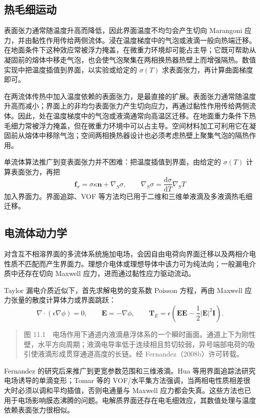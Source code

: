\documentclass[11pt,a4paper,openany,fontset=none]{ctexbook}
\begin{document}
\subsection{热毛细运动}
表面张力通常随温度升高而降低，因此界面温度不均匀会产生切向 Marangoni 应力，并由黏性作用传给两侧流体。浸在温度梯度中的气泡或液滴一般向热端迁移。在地面条件下这种效应常被浮力掩盖，在微重力环境却可能占主导；它既可帮助从凝固前的熔体中移走气泡，也会使气泡聚集在两相换热器热壁上而增强隔热。数值实现中把温度插值到界面，以实验或给定的 $\sigma(T)$ 求表面张力，再计算曲面梯度即可。


在两流体传热中加入温度依赖的表面张力，是最直接的扩展。表面张力通常随温度升高而减小；界面上的非均匀表面张力产生切向应力，再通过黏性作用传给两侧流体。因此，处在温度梯度中的气泡或液滴通常向高温区迁移。在地面重力条件下热毛细力常被浮力掩盖，但在微重力环境中可以占主导。空间材料加工可利用它在凝固前从熔体中移除气泡；空间两相换热器设计也必须考虑热壁上聚集气泡的隔热作用。

单流体算法推广到变表面张力并不困难：把温度插值到界面，由给定的 $\sigma(T)$ 计算表面张力，再把
\begin{equation*}
 \bm f_\sigma=\sigma\kappa\bm n+\nabla_S\sigma,
 \qquad \nabla_S\sigma=\frac{\mathrm d\sigma}{\mathrm dT}\nabla_ST
\end{equation*}
加入界面力。界面追踪、VOF 等方法均已用于二维和三维单液滴及多液滴热毛细迁移。

\subsection{电流体动力学}

对含互不相溶界面的多流体系统施加电场，会因自由电荷向界面迁移以及两相介电性质不匹配而产生界面力。理想介电体或理想导体中该力可为纯法向；一般漏电介质中还存在切向 Maxwell 应力，进而通过黏性应力驱动流动。

Taylor 漏电介质近似下，首先求解电势的变系数 Poisson 方程，再由 Maxwell 应力张量的散度计算体力或界面跳跃：
\begin{equation*}
 \nabla\cdot(\epsilon\nabla\phi)=0,
 \qquad \bm E=-\nabla\phi,
 \qquad \bm T_E=\epsilon\left(\bm E\bm E-\frac12|\bm E|^2\bm I\right).
\end{equation*}
\begin{quote}\small 图 11.1　电场作用下通道内液滴悬浮体系的一个瞬时画面。通道上下为刚性壁，水平方向周期；液滴电导率低于连续相且剪切较弱，异号端部电荷的吸引使液滴形成贯穿通道高度的长链。经 Fernandez（2008b）许可转载。\end{quote}
Fernandez 的研究后来推广到更宽参数范围和三维液滴。Hua 等用界面追踪法研究电场诱导的单滴变形；Tomar 等的 VOF/水平集方法强调，当两相电性质相差很大时必须以调和平均插值，否则电通量与 Maxwell 应力都会失真。这些方法也已用于电场影响膜态沸腾的问题。电解质界面还存在电毛细效应，其数值处理与温度依赖表面张力很相似。
\end{document}

